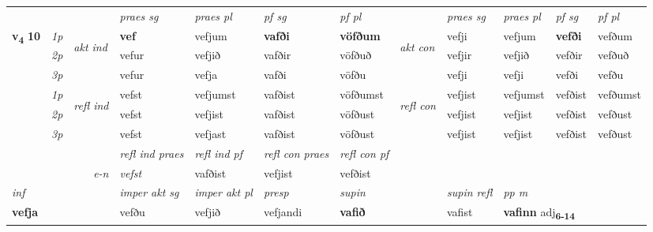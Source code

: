 \begin{longtable}[l]{X>{\footnotesize\itshape}llXXXXlXXXX}
 & &   & \textit{praes sg}  & \textit{praes pl}    & \textit{ pf sg} & \textit{pf pl} & & \textit{praes sg}  & \textit{praes pl}    & \textit{pf sg} & \textit{pf pl }  \\ \cmidrule{4-7} \cmidrule{9-12}
 \multirow{2}{*}{{{\textbf{v{\textsubscript{4}}} \Large{\textbf{10}}}}}  & 1p & \multirow{3}{*}{\begin{turn}{90}\textit{akt ind}\end{turn}} & \textbf{vef} & vefjum & \textbf{vafði} & \textbf{vöfðum} & \multirow{3}{*}{\begin{turn}{90}\textit{akt con}\end{turn}} &vefji & vefjum & \textbf{vefði} & vefðum\\*
 & 2p &  &  vefur  & vefjið & vafðir & vöfðuð & & vefjir & vefjið & vefðir & vefðuð \\*
 & 3p &  & vefur & vefja & vafði & vöfðu & & vefji & vefji& vefði & vefðu \\*
\cmidrule{4-7} \cmidrule{9-12}
 & 1p & \multirow{3}{*}{\begin{turn}{90}\textit{refl ind}\end{turn}}  & vefst & vefjumst & vafðist & vöfðumst & \multirow{3}{*}{\begin{turn}{90}\textit{refl con}\end{turn}}  &vefjist & vefjumst & vefðist & vefðumst \\*
 & 2p &  & vefst & vefjist & vafðist & vöfðust & &vefjist & vefjist & vefðist & vefðust \\*
 & 3p  & & vefst & vefjast & vafðist & vöfðust & & vefjist & vefjist& vefðist & vefðust \\*
\cmidrule{4-7} \cmidrule{9-12}

 & && \textit{refl ind praes} & \textit{refl ind pf} & \textit{refl con praes} & \textit{refl con pf} \\*
\multicolumn{3}{r}{\textit{e-n}}& vefst & vafðist & vefjist & vefðist \\*

\cmidrule{4-7}
   {\textit{inf}} & &  & \textit{imper akt sg} & \textit{imper akt pl}   & \textit{presp} & \textit{supin} && \textit{supin refl} & \textit{pp m} \\*
  {\textbf{vefja}} & && vefðu  & vefjið   & vefjandi &  \textbf{vafið} && vafist & \multicolumn{2}{l}{\textbf{vafinn} adj\textbf{\textsubscript{6-14}}} \\*

\midrule


\end{longtable}
